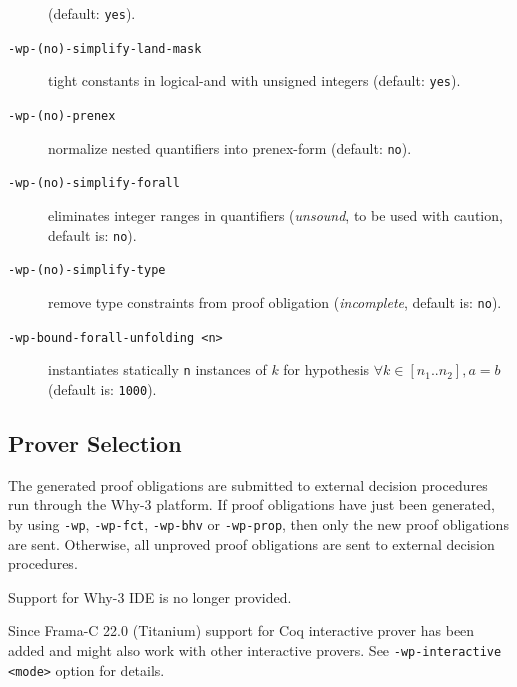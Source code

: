 \begin{description}
  (default: \texttt{yes}).
\item[\tt -wp-(no)-simplify-land-mask] tight constants in logical-and with
  unsigned integers (default: \texttt{yes}).
\item[\tt -wp-(no)-prenex] normalize nested quantifiers into prenex-form
  (default: \texttt{no}).
\item[\tt -wp-(no)-simplify-forall] eliminates integer ranges in quantifiers
  (\emph{unsound}, to be used with caution, default is: \texttt{no}).
\item[\tt -wp-(no)-simplify-type] remove type constraints from proof obligation
  (\emph{incomplete}, default is: \texttt{no}).
\item[\tt -wp-bound-forall-unfolding <n>] instantiates statically \texttt{n}
  instances of $k$ for hypothesis $\forall k \in [n_1..n_2], a = b$
  (default is: \texttt{1000}).
\end{description}

\subsection{Prover Selection}
\label{wp-provers}

The generated proof obligations are submitted to external decision
procedures run through the \textsf{Why-3} platform.  If proof obligations have
just been generated, by using \texttt{-wp}, \texttt{-wp-fct}, \texttt{-wp-bhv}
or \texttt{-wp-prop}, then only the new proof obligations are sent. Otherwise,
all unproved proof obligations are sent to external decision procedures.

Support for \textsf{Why-3 IDE} is no longer provided.

Since \textsf{Frama-C 22.0} (Titanium) support for Coq interactive prover has
been added and might also work with other interactive provers.
See \texttt{-wp-interactive <mode>} option for details.

